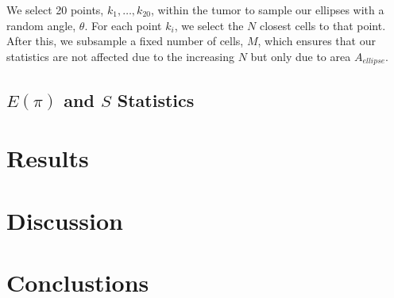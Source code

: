 \documentclass[12pt]{article}
\begin{document}
We select 20 points, $k_1,\ldots,k_{20}$, within the tumor to sample our ellipses with a random angle, $\theta$. For each point $k_i$, we select the $N$ closest cells to that point. After this, we subsample a fixed number of cells, $M$, which ensures that our statistics are not affected due to the increasing $N$ but only due to area $A_{ellipse}$.

\subsection{$E(\pi)$ and $S$ Statistics}


% 
% 
\section{Results}




% 
% 
\section{Discussion}




% 
% 
\section{Conclustions}


\newpage


\end{document}
